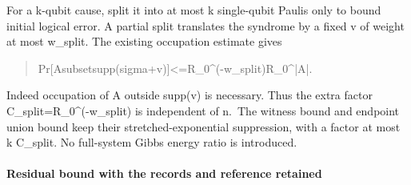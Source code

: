 \documentclass[
]{article}
\begin{document}
For a k-qubit cause, split it into at most k single-qubit Paulis only to
bound initial logical error. A partial split translates the syndrome by
a fixed v of weight at most w\_split. The existing occupation estimate
gives

\begin{quote}\small\ttfamily\raggedright\setlength{\parskip}{0pt}
\noindent P\allowbreak{}r\allowbreak{}[\allowbreak{}A\allowbreak{}\hspace*{0.525em}\allowbreak{}s\allowbreak{}u\allowbreak{}b\allowbreak{}s\allowbreak{}e\allowbreak{}t\allowbreak{}\hspace*{0.525em}\allowbreak{}s\allowbreak{}u\allowbreak{}p\allowbreak{}p\allowbreak{}(\allowbreak{}s\allowbreak{}i\allowbreak{}g\allowbreak{}m\allowbreak{}a\allowbreak{}+\allowbreak{}v\allowbreak{})\allowbreak{}]\allowbreak{}\hspace*{0.525em}\allowbreak{}<\allowbreak{}=\allowbreak{}\hspace*{0.525em}\allowbreak{}R\allowbreak{}\_\allowbreak{}0\allowbreak{}\^{}\allowbreak{}(\allowbreak{}-\allowbreak{}w\allowbreak{}\_\allowbreak{}s\allowbreak{}p\allowbreak{}l\allowbreak{}i\allowbreak{}t\allowbreak{})\allowbreak{}\hspace*{0.525em}\allowbreak{}R\allowbreak{}\_\allowbreak{}0\allowbreak{}\^{}\allowbreak{}|\allowbreak{}A\allowbreak{}|\allowbreak{}.\par
\end{quote}

Indeed occupation of A outside supp(v) is necessary. Thus the extra
factor
C\allowbreak{}\_\allowbreak{}s\allowbreak{}p\allowbreak{}l\allowbreak{}i\allowbreak{}t\allowbreak{}=\allowbreak{}R\allowbreak{}\_\allowbreak{}0\allowbreak{}\^{}\allowbreak{}(\allowbreak{}-\allowbreak{}w\allowbreak{}\_\allowbreak{}s\allowbreak{}p\allowbreak{}l\allowbreak{}i\allowbreak{}t\allowbreak{})
is independent of n.~The witness bound and endpoint union bound keep
their stretched-exponential suppression, with a factor at most k
C\_split. No full-system Gibbs energy ratio is introduced.

\paragraph{Residual bound with the records and reference
retained}\label{residual-bound-with-the-records-and-reference-retained}
\end{document}
